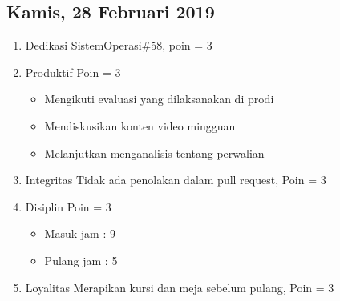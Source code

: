 \subsection{Kamis, 28 Februari 2019}
\begin{enumerate}
\item Dedikasi
\subitem SistemOperasi\#58, poin = 3

\item Produktif
\subitem Poin = 3
\begin{itemize}
\item Mengikuti evaluasi yang dilaksanakan di prodi
\item Mendiskusikan konten video mingguan
\item Melanjutkan menganalisis tentang perwalian 
\end{itemize}

\item Integritas
\subitem Tidak ada penolakan dalam pull request, Poin = 3

\item Disiplin
\subitem Poin = 3
\begin{itemize}
\item Masuk jam : 9 
\item Pulang jam : 5
\end{itemize}

\item Loyalitas
\subitem Merapikan kursi dan meja sebelum pulang, Poin = 3
\end{enumerate}
